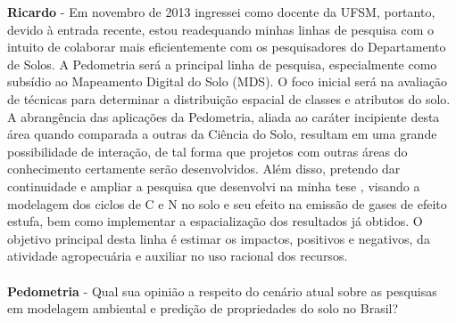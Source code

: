 \textbf{Ricardo} - Em novembro de 2013 ingressei como docente da UFSM, portanto, devido à entrada recente, estou readequando minhas linhas de pesquisa com o intuito de colaborar mais eficientemente com os pesquisadores do Departamento de Solos. A Pedometria será a principal linha de pesquisa, especialmente como subsídio ao Mapeamento Digital do Solo (MDS). O foco inicial será na avaliação de técnicas para determinar a distribuição espacial de classes e atributos do solo. A abrangência das aplicações da Pedometria, aliada ao caráter incipiente desta área quando comparada a outras da Ciência do Solo, resultam em uma grande possibilidade de interação, de tal forma que projetos com outras áreas do conhecimento certamente serão desenvolvidos. Além disso, pretendo dar continuidade e ampliar a pesquisa que desenvolvi na minha tese \citep{Schenato:2013}, visando a modelagem dos ciclos de C e N no solo e seu efeito na emissão de gases de efeito estufa, bem como implementar a espacialização dos resultados já obtidos. O objetivo principal desta linha é estimar os impactos, positivos e negativos, da atividade agropecuária e auxiliar no uso racional dos recursos.\\
\\
\textbf{Pedometria} - Qual sua opinião a respeito do cenário atual sobre as pesquisas em modelagem ambiental e predição de propriedades do solo no Brasil?\\
\\
